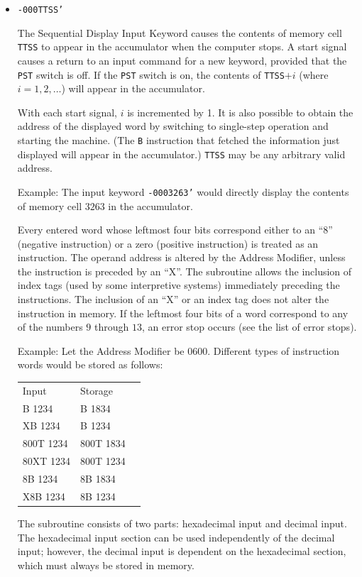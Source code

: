 \documentclass{article}
\begin{document}
\begin{enumerate}
\begin{itemize}
\item \texttt{-000TTSS'}

The Sequential Display Input Keyword causes the contents of memory cell \texttt{TTSS} to appear in the accumulator when the computer stops. A start signal causes a return to an input command for a new keyword, provided that the \texttt{PST} switch is off. If the \texttt{PST} switch is on, the contents of \texttt{TTSS$ + i$} (where $i = 1, 2, \dots$) will appear in the accumulator.

With each start signal, $i$ is incremented by 1. It is also possible to obtain the address of the displayed word by switching to single-step operation and starting the machine. (The \texttt{B} instruction that fetched the information just displayed will appear in the accumulator.) \texttt{TTSS} may be any arbitrary valid address.

Example: The input keyword \texttt{-0003263'} would directly display the contents of memory cell $3263$ in the accumulator.

Every entered word whose leftmost four bits correspond either to an ``8'' (negative instruction) or a zero (positive instruction) is treated as an instruction. The operand address is altered by the Address Modifier, unless the instruction is preceded by an ``X''. The subroutine allows the inclusion of index tags (used by some interpretive systems) immediately preceding the instructions. The inclusion of an ``X'' or an index tag does not alter the instruction in memory. If the leftmost four bits of a word correspond to any of the numbers $9$ through $13$, an error stop occurs (see the list of error stops).

Example: Let the Address Modifier be $0600$. Different types of instruction words would be stored as follows:

\begin{tabular}{lll}
Input     &   Storage \\
B 1234    &    B 1834 \\
XB 1234   &    B 1234 \\
800T 1234 &    800T 1834 \\
80XT 1234 &    800T 1234 \\
8B 1234   &    8B 1834 \\
X8B 1234  &    8B 1234 \\
\end{tabular}

The subroutine consists of two parts: hexadecimal input and decimal input. The hexadecimal input section can be used independently of the decimal input; however, the decimal input is dependent on the hexadecimal section, which must always be stored in memory.
\end{itemize}


\end{enumerate}
\end{document}
